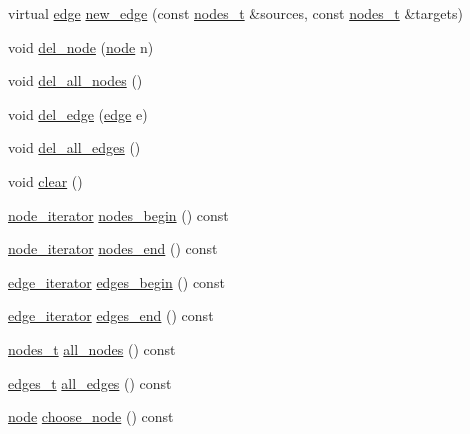 \begin{DoxyCompactItemize}
\item 
virtual \mbox{\hyperlink{classedge}{edge}} \mbox{\hyperlink{classgraph_a2ae550efa58c48056d5df22ed26c5c6c}{new\+\_\+edge}} (const \mbox{\hyperlink{edge_8h_a22ac17689106ba21a84e7bc54d1199d6}{nodes\+\_\+t}} \&sources, const \mbox{\hyperlink{edge_8h_a22ac17689106ba21a84e7bc54d1199d6}{nodes\+\_\+t}} \&targets)
\item 
void \mbox{\hyperlink{classgraph_a8bdc09d5b9ac4bd26586b054d8fcbe91}{del\+\_\+node}} (\mbox{\hyperlink{classnode}{node}} n)
\item 
void \mbox{\hyperlink{classgraph_ad0ca1578643a51f96a76a846f14558df}{del\+\_\+all\+\_\+nodes}} ()
\item 
void \mbox{\hyperlink{classgraph_ad9356508c49c542dfd4b7169297387c6}{del\+\_\+edge}} (\mbox{\hyperlink{classedge}{edge}} e)
\item 
void \mbox{\hyperlink{classgraph_aae52be443c5aef001b5f6758855f15ad}{del\+\_\+all\+\_\+edges}} ()
\item 
void \mbox{\hyperlink{classgraph_a9ff5d6af3653e79f87b836701453f55a}{clear}} ()
\item 
\mbox{\hyperlink{classgraph_a2cb374b84c133ce13f94e73c3e5da7fa}{node\+\_\+iterator}} \mbox{\hyperlink{classgraph_aec053a4b509d1be804237a80044c54c0}{nodes\+\_\+begin}} () const
\item 
\mbox{\hyperlink{classgraph_a2cb374b84c133ce13f94e73c3e5da7fa}{node\+\_\+iterator}} \mbox{\hyperlink{classgraph_abbf9c0cb5629e98e1142254911238173}{nodes\+\_\+end}} () const
\item 
\mbox{\hyperlink{classgraph_a818d3766018eb0af91d520ce2150203c}{edge\+\_\+iterator}} \mbox{\hyperlink{classgraph_a7ba35a4c4e8343ffb27ed6d9703c6f18}{edges\+\_\+begin}} () const
\item 
\mbox{\hyperlink{classgraph_a818d3766018eb0af91d520ce2150203c}{edge\+\_\+iterator}} \mbox{\hyperlink{classgraph_aea8d7f976b85b6137f52d915e26639f6}{edges\+\_\+end}} () const
\item 
\mbox{\hyperlink{edge_8h_a22ac17689106ba21a84e7bc54d1199d6}{nodes\+\_\+t}} \mbox{\hyperlink{classgraph_a268af566b8df2cbaede1319ad370dc7e}{all\+\_\+nodes}} () const
\item 
\mbox{\hyperlink{edge_8h_a8f9587479bda6cf612c103494b3858e3}{edges\+\_\+t}} \mbox{\hyperlink{classgraph_aa0c7027e0cc7430b77ab9629eecefd3f}{all\+\_\+edges}} () const
\item 
\mbox{\hyperlink{classnode}{node}} \mbox{\hyperlink{classgraph_aec5c11c90a94ebd145f059a541db860e}{choose\+\_\+node}} () const
\item 

\end{DoxyCompactItemize}
